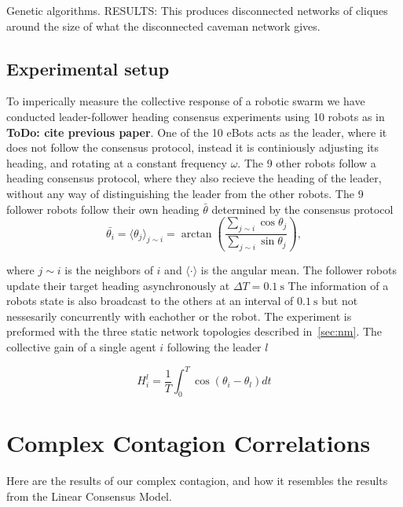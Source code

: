 \documentclass[fleqn,10pt]{wlscirep}
\newcommand{\TODO}[1]{{\bf {\color{red} ToDo:} #1}}
\begin{document}
Genetic algorithms. RESULTS: This produces disconnected networks of cliques around the size of what the disconnected caveman network gives.



\subsection*{Experimental setup}
\label{sec:exp}

To imperically measure the collective response of a robotic swarm we have conducted leader-follower heading consensus experiments using 10 robots as in \TODO{cite previous paper}. One of the 10 eBots acts as the leader, where it does not follow the consensus protocol, instead it is continiously adjusting its heading, and rotating at a constant frequency $\omega$. The 9 other robots follow a heading consensus protocol, where they also recieve the heading of the leader, without any way of distinguishing the leader from the other robots. The 9 follower robots follow their own heading $\bar{\theta}$ determined by the consensus protocol
\begin{equation}
  \label{eq:ang_mean}
  \bar{\theta_i} = \langle \theta_j\rangle_{j \sim i} = \arctan \left(\frac{\sum_{j \sim i} \cos\theta_j}{\sum_{j \sim i} \sin{\theta_j}}\right),
\end{equation}

where $j\sim i$ is the neighbors of $i$ and $\langle \cdot \rangle$ is the angular mean. The follower robots update their target heading asynchronously at $\Delta T = \SI{0.1}{\second} $  The information of a robots state is also broadcast to the others at an interval of $\SI{0.1}{\second}$ but not nessesarily concurrently with eachother or the robot. The experiment is preformed with the three static network topologies described in~\ref{sec:nm}. The collective gain of a single agent $i$ following the leader $l$

\begin{equation}
\label{eq:ang_con}
H^l_i = \frac{1}{T}\int_0^T \cos(\theta_i - \theta_l) dt
\end{equation}

\section{Complex Contagion Correlations}

Here are the results of our complex contagion, and how it resembles the results from the Linear Consensus Model.
\end{document}
